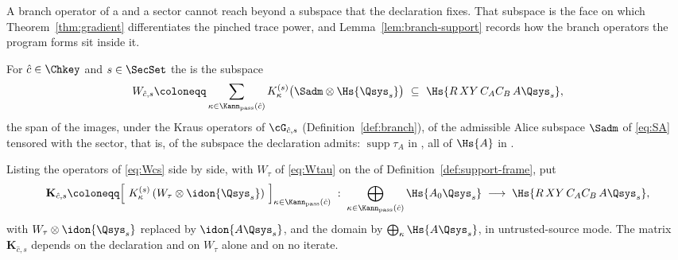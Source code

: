 
A branch operator of a  and a sector cannot
reach beyond a subspace that the declaration fixes. That subspace is the face
on which Theorem~\ref{thm:gradient} differentiates the pinched trace power,
and Lemma~\ref{lem:branch-support} records how the branch operators the
program forms sit inside it.

\begin{definition}\label{def:branch-support}
For $\hat c\in\Chkey$ and $s\in\SecSet$ the
is the subspace
\begin{equation}\label{eq:Wcs}
  W_{\hat c,s}\coloneqq
  \sum_{\kappa\in\Kann_{\mathrm{pass}}(\hat c)}
  K^{(s)}_{\kappa}\big(\Sadm\otimes\Hs{\Qsys_s}\big)
  \ \subseteq\ \Hs{R\,XY\,C_AC_B\,A\Qsys_s},
\end{equation}
the span of the images, under the Kraus operators of $\cG_{\hat c,s}$
(Definition~\ref{def:branch}), of the admissible Alice subspace
$\Sadm$ of \eqref{eq:SA} tensored with the sector, that is, of the
subspace the declaration admits: $\operatorname{supp}\tau_A$ in
, all of $\Hs{A}$ in
.

Listing the operators of \eqref{eq:Wcs} side by side, with $W_{\tau}$ of
\eqref{eq:Wtau} on the  of
Definition~\ref{def:support-frame}, put
\begin{equation}\label{eq:Kstack}
  \mathbf K_{\hat c,s}\coloneqq
  \Big[\ K^{(s)}_{\kappa}\,(W_{\tau}\otimes\idon{\Qsys_s})\ \Big]
  _{\kappa\in\Kann_{\mathrm{pass}}(\hat c)}
  \;:\;\bigoplus_{\kappa\in\Kann_{\mathrm{pass}}(\hat c)}\Hs{A_0\Qsys_s}
  \;\longrightarrow\;\Hs{R\,XY\,C_AC_B\,A\Qsys_s},
\end{equation}
with $W_{\tau}\otimes\idon{\Qsys_s}$ replaced by $\idon{A\Qsys_s}$, and
the domain by $\bigoplus_{\kappa}\Hs{A\Qsys_s}$, in untrusted-source mode.
The matrix $\mathbf K_{\hat c,s}$ depends on the declaration and on
$W_{\tau}$ alone and on no iterate.
\end{definition}
